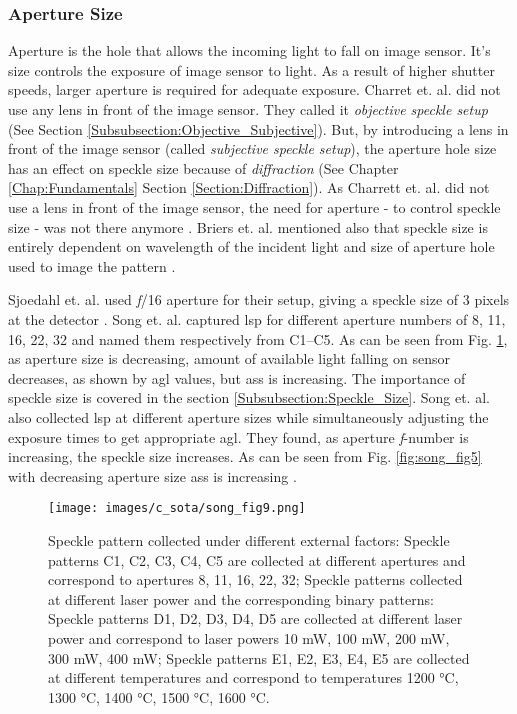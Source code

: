     
    \subsubsection*{Aperture Size}
    Aperture is the hole that allows the incoming light to fall on image sensor. It's size controls the exposure of image sensor to light. As a result of higher shutter speeds, larger aperture is required for adequate exposure. Charret et. al. did not use any lens in front of the image sensor. They called it \emph{objective speckle setup} (See Section \ref{Subsubsection:Objective_Subjective}). But, by introducing a lens in front of the image sensor (called \emph{subjective speckle setup}), the aperture hole size has an effect on speckle size because of \emph{diffraction} (See Chapter \ref{Chap:Fundamentals} Section \ref{Section:Diffraction}). As Charrett et. al. did not use a lens in front of the image sensor, the need for aperture - to control speckle size - was not there anymore \cite{charrett_2018}. Briers et. al. mentioned also that speckle size is entirely dependent on wavelength of the incident light and size of aperture hole used to image the pattern \cite{briers}.

    \vspace{5mm}
    \noindent Sjoedahl et. al. used \emph{f}/16 aperture for their setup, giving a speckle size of 3 pixels at the detector \cite{sjoedahl}. Song et. al. captured \gls{lsp} for different aperture numbers of 8, 11, 16, 22, 32 and named them respectively from C1--C5. As can be seen from Fig. \ref{fig:song_fig9}, as aperture size is decreasing, amount of available light falling on sensor decreases, as shown by \gls{agl} values, but \gls{ass} is increasing. The importance of speckle size is covered in the section \ref{Subsubsection:Speckle_Size}. Song et. al. also collected \Gls{lsp} at different aperture sizes while simultaneously adjusting the exposure times to get appropriate \gls{agl}. They found, as aperture \emph{f}-number is increasing, the speckle size increases. As can be seen from Fig. \ref{fig:song_fig5} with decreasing aperture size \gls{ass} is increasing \cite{song}.

    \begin{figure}[h]
        \centering
        \texttt{[image: images/c\_sota/song\_fig9.png]}
        \caption{Speckle pattern collected under different external factors: Speckle patterns C1, C2, C3, C4, C5 are collected at different apertures and correspond to apertures 8, 11, 16, 22, 32; Speckle patterns collected at different laser power and the corresponding binary patterns: Speckle patterns D1, D2, D3, D4, D5 are collected at different laser power and correspond to laser powers 10 mW, 100 mW, 200 mW, 300 mW, 400 mW; Speckle patterns E1, E2, E3, E4, E5 are collected at different temperatures and correspond to temperatures 1200 °C, 1300 °C, 1400 °C, 1500 °C, 1600 °C. \cite{song}}
        \label{fig:song_fig9}
    \end{figure} 


